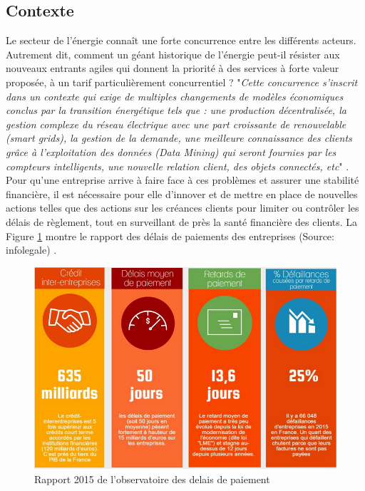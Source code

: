 \documentclass[11pt,a4paper]{report}
\begin{document}
\subsection{Contexte}
Le secteur de l'énergie connaît une forte concurrence entre les différents acteurs. Autrement dit, comment un géant historique de l’énergie peut-il résister aux nouveaux entrants agiles qui donnent la priorité à des services à forte valeur proposée, à un tarif particulièrement concurrentiel ? "\textit{Cette concurrence s'inscrit dans un contexte qui exige de multiples changements de modèles économiques conclus par la transition énergétique tels que : une production décentralisée, la gestion complexe du réseau électrique avec une part croissante de renouvelable (smart grids), la gestion de la demande, une meilleure connaissance des clients grâce à l’exploitation des données (Data Mining) qui seront fournies par les compteurs intelligents, une nouvelle relation client, des objets connectés, etc}" \cite{cap}. 
Pour qu'une entreprise arrive à faire face à ces problèmes et assurer une stabilité financière, il est nécessaire pour elle d'innover et de mettre en place de nouvelles actions telles que  des actions sur les créances clients pour limiter ou contrôler les délais de règlement, tout en surveillant de près la santé financière des clients. La Figure  \ref{figure1} montre le rapport des délais de paiements des entreprises (Source: infolegale) \cite{infolegale}.   
\begin{figure}[h]
   \centering
   \includegraphics[scale=0.50]{infolegale.PNG}
      \caption{Rapport 2015 de l'observatoire des delais de
      paiement}
      \label{figure1}
\end{figure}
\end{document}
